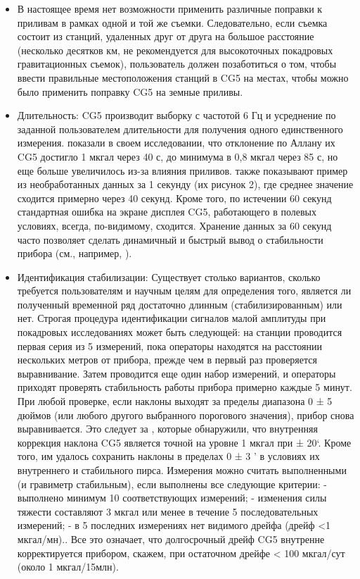 \begin{itemize}
    \item В настоящее время нет возможности применить различные поправки к
    приливам в рамках одной и той же съемки. Следовательно, если съемка состоит
    из станций, удаленных друг от друга на большое расстояние (несколько
    десятков км, не рекомендуется для высокоточных покадровых гравитационных
    съемок), пользователь должен позаботиться о том, чтобы ввести правильные
    местоположения станций в CG5 на местах, чтобы можно было применить поправку
    CG5 на земные приливы.
    
    \item Длительность: CG5 производит выборку с частотой 6 Гц и усреднение по
    заданной пользователем длительности для получения одного единственного
    измерения. \cite{merlet_micro-gravity_2008} показали в своем исследовании, что
    отклонение по Аллану их CG5 достигло 1 мкгал через 40 с, до минимума в 0,8
    мкгал через 85 с, но еще больше увеличилось из-за влияния приливов.
    \cite{gettings_techniques_2008} также показывают пример из необработанных
    данных за 1 секунду (их рисунок 2), где среднее значение сходится примерно
    через 40 секунд.  Кроме того, по истечении 60 секунд стандартная ошибка на
    экране дисплея CG5, работающего в полевых условиях, всегда, по-видимому,
    сходится. Хранение данных за 60 секунд часто позволяет сделать динамичный и
    быстрый вывод о стабильности прибора (см., например, \cite{hector_water_2015}).

    \item Идентификация стабилизации: Существует столько вариантов, сколько
    требуется пользователям и научным целям для определения того, является ли
    полученный временной ряд достаточно длинным (стабилизированным) или нет.
    Строгая процедура идентификации сигналов малой амплитуды при покадровых
    исследованиях может быть следующей: на станции проводится первая серия из 5
    измерений, пока операторы находятся на расстоянии нескольких метров от
    прибора, прежде чем в первый раз проверяется выравнивание. Затем проводится
    еще один набор измерений, и операторы приходят проверять стабильность работы
    прибора примерно каждые 5 минут. При любой проверке, если наклоны выходят за
    пределы диапазона 0 ± 5 дюймов (или любого другого выбранного порогового
    значения), прибор снова выравнивается. Это следует за \cite{merlet_micro-gravity_2008},
    которые обнаружили, что внутренняя коррекция наклона CG5 является точной на
    уровне 1 мкгал при ± 20‘. Кроме того, им удалось сохранить наклоны в
    пределах 0 ± 3 ’ в условиях их внутреннего и стабильного пирса. Измерения
    можно считать выполненными (и гравиметр стабильным), если выполнены все
    следующие критерии: - выполнено минимум 10 соответствующих измерений; -
    изменения силы тяжести составляют 3 мкгал или менее в течение 5
    последовательных измерений; - в 5 последних измерениях нет видимого дрейфа
    (дрейф <1 мкгал/мн).. Все это означает, что долгосрочный дрейф CG5 внутренне
    корректируется прибором, скажем, при остаточном дрейфе < 100 мкгал/сут
    (около 1 мкгал/15млн).
    
\end{itemize}